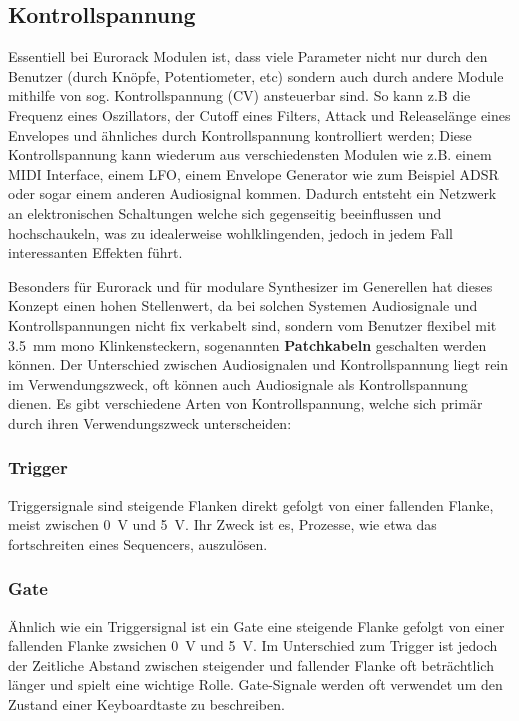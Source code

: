 \subsection{Kontrollspannung}
\label{sec:org81b89f6}
Essentiell bei Eurorack Modulen ist, dass viele Parameter nicht nur durch den Benutzer (durch Knöpfe, Potentiometer, etc) sondern auch durch andere Module mithilfe von sog. Kontrollspannung (CV) ansteuerbar sind. So kann z.B die Frequenz eines Oszillators, der Cutoff eines Filters, Attack und Releaselänge eines Envelopes und ähnliches durch Kontrollspannung kontrolliert werden; Diese Kontrollspannung kann wiederum aus verschiedensten Modulen wie z.B. einem MIDI Interface, einem LFO, einem Envelope Generator wie zum Beispiel ADSR oder sogar einem anderen Audiosignal kommen. Dadurch entsteht ein Netzwerk an elektronischen Schaltungen welche sich gegenseitig beeinflussen und hochschaukeln, was zu idealerweise wohlklingenden, jedoch in jedem Fall interessanten Effekten führt.

Besonders für Eurorack und für modulare Synthesizer im Generellen hat dieses Konzept einen hohen Stellenwert, da bei solchen Systemen Audiosignale und Kontrollspannungen nicht fix verkabelt sind, sondern vom Benutzer flexibel mit \SI{3.5}{\milli\meter} mono Klinkensteckern, sogenannten \textbf{Patchkabeln} geschalten werden können. Der Unterschied zwischen Audiosignalen und Kontrollspannung liegt rein im Verwendungszweck, oft können auch Audiosignale als Kontrollspannung dienen. Es gibt verschiedene Arten von Kontrollspannung, welche sich primär durch ihren Verwendungszweck unterscheiden:

\subsubsection{Trigger}
\label{sec:org0ddb48b}
Triggersignale sind steigende Flanken direkt gefolgt von einer fallenden Flanke, meist zwischen \SI{0}{\volt} und \SI{5}{\volt}. Ihr Zweck ist es, Prozesse, wie etwa das fortschreiten eines Sequencers, auszulösen.

\subsubsection{Gate}
\label{sec:org94f3e5b}
Ähnlich wie ein Triggersignal ist ein Gate eine steigende Flanke gefolgt von einer fallenden Flanke zwsichen \SI{0}{\volt} und \SI{5}{\volt}. Im Unterschied zum Trigger ist jedoch der Zeitliche Abstand zwischen steigender und fallender Flanke oft beträchtlich länger und spielt eine wichtige Rolle. Gate-Signale werden oft verwendet um den Zustand einer Keyboardtaste zu beschreiben.

